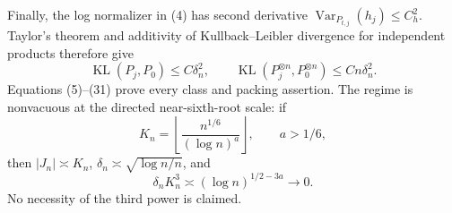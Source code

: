 Finally, the log normalizer in (4) has second derivative \(\operatorname{Var}_{P_{t,j}}(h_j)\leq C_h^2\).  Taylor's theorem and additivity of Kullback--Leibler divergence for independent products therefore give
\[
 \operatorname{KL}(P_j,P_0)\leq C\delta_n^2,\qquad
 \operatorname{KL}(P_j^{\otimes n},P_0^{\otimes n})\leq Cn\delta_n^2.                  \tag{31}
\]
Equations (5)--(31) prove every class and packing assertion.  The regime is nonvacuous at the directed near-sixth-root scale: if
\[
 K_n=\left\lfloor\frac{n^{1/6}}{(\log n)^a}\right\rfloor,\qquad a>1/6,
\]
then \(|J_n|\asymp K_n\), \(\delta_n\asymp\sqrt{\log n/n}\), and
\[
 \delta_nK_n^3\asymp(\log n)^{1/2-3a}\longrightarrow0.                                \tag{32}
\]
No necessity of the third power is claimed.